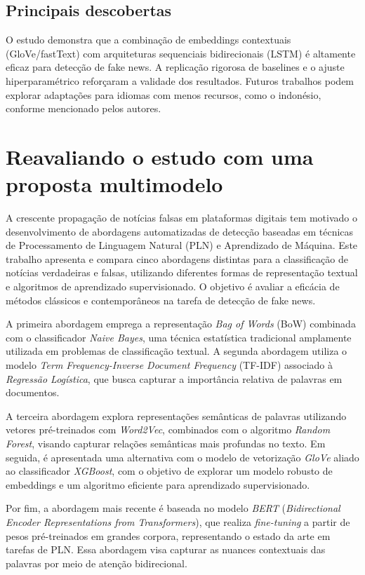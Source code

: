 \documentclass[conference]{IEEEtran}
\begin{document}
\subsection{Principais descobertas}

O estudo demonstra que a combinação de embeddings contextuais (GloVe/fastText) com arquiteturas sequenciais bidirecionais (LSTM) é altamente eficaz para detecção de fake news. A replicação rigorosa de baselines e o ajuste hiperparamétrico reforçaram a validade dos resultados. Futuros trabalhos podem explorar adaptações para idiomas com menos recursos, como o indonésio, conforme mencionado pelos autores.

\section{Reavaliando o estudo com uma proposta multimodelo}

A crescente propagação de notícias falsas em plataformas digitais tem motivado o desenvolvimento de abordagens automatizadas de detecção baseadas em técnicas de Processamento de Linguagem Natural (PLN) e Aprendizado de Máquina. Este trabalho apresenta e compara cinco abordagens distintas para a classificação de notícias verdadeiras e falsas, utilizando diferentes formas de representação textual e algoritmos de aprendizado supervisionado. O objetivo é avaliar a eficácia de métodos clássicos e contemporâneos na tarefa de detecção de fake news.

A primeira abordagem emprega a representação \textit{Bag of Words} (BoW) combinada com o classificador \textit{Naive Bayes}, uma técnica estatística tradicional amplamente utilizada em problemas de classificação textual. A segunda abordagem utiliza o modelo \textit{Term Frequency-Inverse Document Frequency} (TF-IDF) associado à \textit{Regressão Logística}, que busca capturar a importância relativa de palavras em documentos.

A terceira abordagem explora representações semânticas de palavras utilizando vetores pré-treinados com \textit{Word2Vec}, combinados com o algoritmo \textit{Random Forest}, visando capturar relações semânticas mais profundas no texto. Em seguida, é apresentada uma alternativa com o modelo de vetorização \textit{GloVe} aliado ao classificador \textit{XGBoost}, com o objetivo de explorar um modelo robusto de embeddings e um algoritmo eficiente para aprendizado supervisionado.

Por fim, a abordagem mais recente é baseada no modelo \textit{BERT} (\textit{Bidirectional Encoder Representations from Transformers}), que realiza \textit{fine-tuning} a partir de pesos pré-treinados em grandes corpora, representando o estado da arte em tarefas de PLN. Essa abordagem visa capturar as nuances contextuais das palavras por meio de atenção bidirecional.
\end{document}
